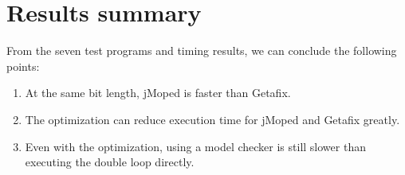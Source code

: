 \section{Results summary}
From the seven test programs and timing results, we can conclude the following points:
\begin{enumerate}
\item At the same bit length, jMoped is faster than Getafix. 
\item The optimization can reduce execution time for jMoped and Getafix greatly.
\item Even with the optimization, using a model checker is still slower than executing the double loop directly.
\end{enumerate}

